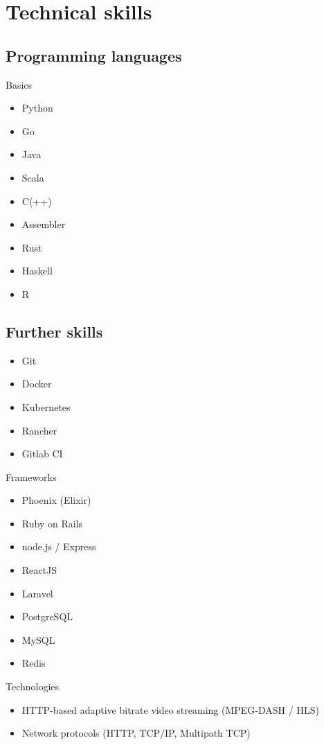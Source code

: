 \documentclass[11pt,a4paper,sans]{moderncv}        %
\begin{document}
\section{Technical skills}
\subsection{\textbf{Programming languages}}
\smallskip
{}
{Basics}{
\begin{itemize}
\item Python
\item Go
\item Java
\item Scala
\item C(++)
\item Assembler
\item Rust
\item Haskell
\item R
\end{itemize}}
\subsection{\textbf{Further skills}}
\smallskip
{}
{
\begin{itemize}
\item Git
\item Docker
\item Kubernetes
\item Rancher
\item Gitlab CI
\end{itemize}
}
{Frameworks}
{
\begin{itemize}
\item Phoenix (Elixir)
\item Ruby on Rails
\item node.js / Express
\item ReactJS
\item Laravel
\end{itemize}
}

\medskip

{
\begin{itemize}
\item PostgreSQL
\item MySQL
\item Redis
\end{itemize}
}
{Technologies}
{
  \begin{itemize}
    \item HTTP-based adaptive bitrate video streaming (MPEG-DASH / HLS)
    \item Network protocols (HTTP, TCP/IP, Multipath TCP)
  \end{itemize}
}
\end{document}
